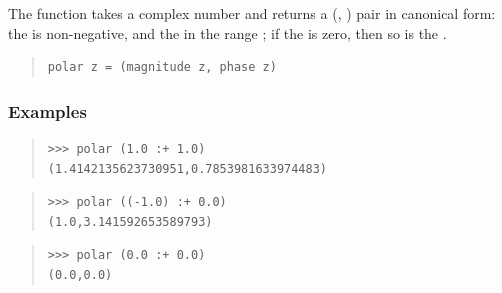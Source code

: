 \begin{haddockdesc}
\item[\begin{tabular}{@{}l}
polar :: RealFloat a => Complex a -> (a, a)
\end{tabular}]
{\haddockbegindoc
The function  takes a complex number and
 returns a (, ) pair in canonical form:
 the  is non-negative, and the  in the range ;
 if the  is zero, then so is the .\par
\begin{quote}
{\haddockverb\begin{verbatim}
polar z = (magnitude z, phase z)\end{verbatim}}
\end{quote}
\subsubsection*{\textbf{Examples}}
\begin{quote}
{\haddockverb\begin{verbatim}
>>> polar (1.0 :+ 1.0)
(1.4142135623730951,0.7853981633974483)

\end{verbatim}}
\end{quote}
\begin{quote}
{\haddockverb\begin{verbatim}
>>> polar ((-1.0) :+ 0.0)
(1.0,3.141592653589793)

\end{verbatim}}
\end{quote}
\begin{quote}
{\haddockverb\begin{verbatim}
>>> polar (0.0 :+ 0.0)
(0.0,0.0)

\end{verbatim}}
\end{quote}}
\end{haddockdesc}
